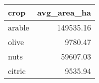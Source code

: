 \begin{table}[ht]
\centering
\begin{tabular}{lr}
  \hline
crop & avg\_area\_ha \\ 
  \hline
arable & 149535.16 \\ 
  olive & 9780.47 \\ 
  nuts & 59607.03 \\ 
  citric & 9535.94 \\ 
   \hline
\end{tabular}
\end{table}
